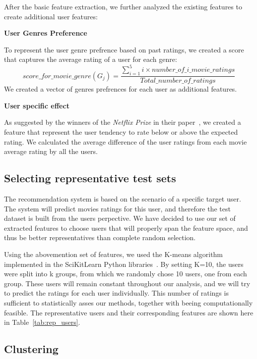 After the basic feature extraction, we further analyzed the existing features to create additional user features:

\textbf{User Genres Preference}

To represent the user genre prefrence based on past ratings, we created a score that captures the average rating of a user for each genre: 
\begin{equation} score\_for\_movie\_genre(G_j) = \frac{\sum^5_{i=1}{i\times number\_of\_i\_movie\_ratings}}{Total\_number\_of\_ratings} 
\end{equation}
We created a vector of genres prefrences for each user as additional features.

\textbf{User specific effect}

As suggested by the winners of the \textit{Netflix Prize} in their paper~\cite{bell2007bellkor}, we created a feature that represent the user tendency to rate below or above the expected rating. We calculated the average difference of the user ratings from each movie average rating by all the users.

\subsection{Selecting representative test sets}
The recommendation system is based on the scenario of a specific target user. The system will predict movies ratings for this user, and therefore the test dataset is built from the users perpective. We have decided to use our set of extracted features to choose users that will properly span the feature space, and thus be better representatives than complete random selection. 

Using the abovemention set of features, we used the K-means algorithm implemented in the SciKitLearn Python libraries~\cite{pedregosa2011scikit}. By setting K=10, the users were split into k groups, from which we randomly chose 10 users, one from each group. These users will remain constant throughout our analysis, and we will try to predict the ratings for each user individually. This number of ratings is sufficient to statistically asses our methods, together with beeing computationally feasible. The representative users and their corresponding features are shown here in Table~\ref{tab:rep_users}.


\subsection{Clustering}


